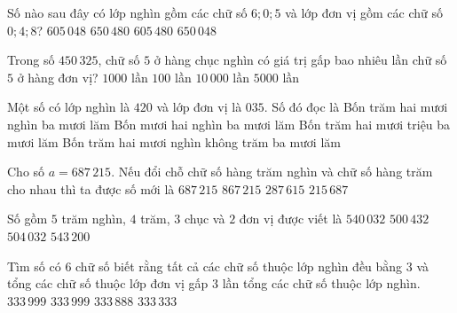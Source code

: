 \begin{ex} %
Số nào sau đây có lớp nghìn gồm các chữ số $6; 0; 5$ và lớp đơn vị gồm các chữ số $0; 4; 8$?
\choice
{\True $605\,048$}
{$650\,480$}
{$605\,480$}
{$650\,048$}
\end{ex}

\begin{ex} %
Trong số $450\,325$, chữ số $5$ ở hàng chục nghìn có giá trị gấp bao nhiêu lần chữ số $5$ ở hàng đơn vị?
\choice
{$1000$ lần}
{$100$ lần}
{\True $10\,000$ lần}
{$5000$ lần}
\end{ex}

\begin{ex} %
Một số có lớp nghìn là $420$ và lớp đơn vị là $035$. Số đó đọc là
\choice
{Bốn trăm hai mươi nghìn ba mươi lăm}
{Bốn mươi hai nghìn ba mươi lăm}
{Bốn trăm hai mươi triệu ba mươi lăm}
{\True Bốn trăm hai mươi nghìn không trăm ba mươi lăm}
\end{ex}

\begin{ex} %
Cho số $a = 687\,215$. Nếu đổi chỗ chữ số hàng trăm nghìn và chữ số hàng trăm cho nhau thì ta được số mới là
\choice
{$687\,215$}
{$867\,215$}
{\True $287\,615$}
{$215\,687$}
\end{ex}

\begin{ex} %
Số gồm $5$ trăm nghìn, $4$ trăm, $3$ chục và $2$ đơn vị được viết là
\choice
{$540\,032$}
{\True $500\,432$}
{$504\,032$}
{$543\,200$}
\end{ex}

\begin{ex} %
Tìm số có 6 chữ số biết rằng tất cả các chữ số thuộc lớp nghìn đều bằng 3 và tổng các chữ số thuộc lớp đơn vị gấp 3 lần tổng các chữ số thuộc lớp nghìn.
\choice
{\True $333\,999$}
{$333\,999$}
{$333\,888$}
{$333\,333$}
\end{ex}

